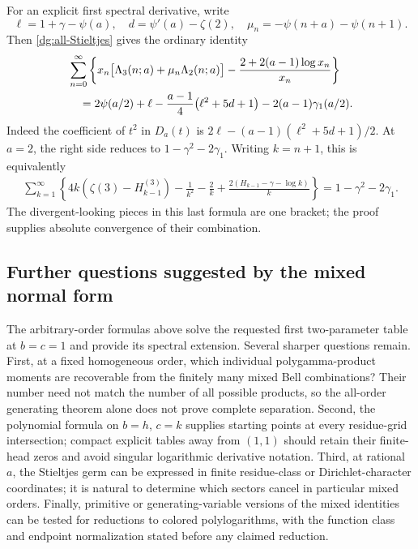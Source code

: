 For an explicit first spectral derivative, write
\[
 \ell=1+\gamma-\psi(a),\quad
 d=\psi'(a)-\zeta(2),\quad
 \mu_n=-\psi(n+a)-\psi(n+1).
\]
Then \eqref{dg:all-Stieltjes} gives the ordinary identity
\begin{align}
 &\sum_{n=0}^{\infty}\left\{
 x_n\bigl[\Lambda_3(n;a)+\mu_n\Lambda_2(n;a)\bigr]
       -\frac{2+2(a-1)\log x_n}{x_n}\right\}\notag\\
 &\quad=2\psi(a/2)+\ell
       -\frac{a-1}{4}\bigl(\ell^2+5d+1\bigr)
       -2(a-1)\gamma_1(a/2).
 \label{dg:first-spectral}
\end{align}
Indeed the coefficient of $t^2$ in $D_a(t)$ is
$2\ell-(a-1)(\ell^2+5d+1)/2$.
At $a=2$, the right side reduces to
$1-\gamma^2-2\gamma_1$. Writing $k=n+1$, this is equivalently
\begin{align}
 \sum_{k=1}^{\infty}\left\{
 4k(\zeta(3)-H_{k-1}^{(3)})-\frac1{k^2}-\frac2k
 +\frac{2(H_{k-1}-\gamma-\log k)}k\right\}
 =1-\gamma^2-2\gamma_1.
 \label{dg:harmonic-Stieltjes}
\end{align}
The divergent-looking pieces in this last formula are one bracket;
the proof supplies absolute convergence of their combination.

\subsection{Further questions suggested by the mixed normal form}

The arbitrary-order formulas above solve the requested first
two-parameter table at $b=c=1$ and provide its spectral extension.
Several sharper questions remain. First, at a fixed homogeneous
order, which individual polygamma-product moments are recoverable
from the finitely many mixed Bell combinations? Their number need
not match the number of all possible products, so the all-order
generating theorem alone does not prove complete separation.
Second, the polynomial formula on $b=h$, $c=k$ supplies starting
points at every residue-grid intersection; compact explicit tables
away from $(1,1)$ should retain their finite-head zeros and avoid
singular logarithmic derivative notation. Third, at rational $a$,
the Stieltjes germ can be expressed in finite residue-class or
Dirichlet-character coordinates; it is natural to determine which
sectors cancel in particular mixed orders. Finally, primitive or
generating-variable versions of the mixed identities can be tested
for reductions to colored polylogarithms, with the function class
and endpoint normalization stated before any claimed reduction.
